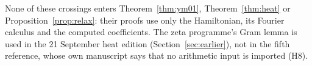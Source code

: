None of these crossings enters Theorem~\ref{thm:ym01}, Theorem~\ref{thm:heat} or Proposition~\ref{prop:relax}: their proofs use only the Hamiltonian, its Fourier calculus and the computed coefficients. The zeta programme's Gram lemma is used in the 21 September heat edition (Section~\ref{sec:earlier}), not in the fifth reference, whose own manuscript says that no arithmetic input is imported (H8).
